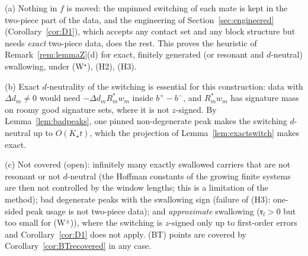 \begin{remark}\label{rem:S}
(a) Nothing in $f$ is moved: the unpinned switching of each mate is kept in
the two-piece part of the data, and the engineering of
Section~\ref{sec:engineered} (Corollary~\ref{cor:D1}), which accepts any
contact set and any block structure but needs \emph{exact} two-piece data,
does the rest.  This proves the heuristic of Remark~\ref{rem:lemmaZ}(d)
for exact, finitely generated (or resonant and $d$-neutral) swallowing,
under \textup{(W$^\star$)}, \textup{(H2)}, \textup{(H3)}.

(b) Exact $d$-neutrality of the switching is essential for this
construction: data with $\Delta d_m\neq0$ would need $-\Delta d_mR_m^*w_m$
inside $b^+-b^-$, and $R_m^*w_m$ has signature mass on roomy good signature
sets, where it is not $z$-signed.  By Lemma~\ref{lem:badpeaks}, one pinned
non-degenerate peak makes the switching $d$-neutral up to $O(K_\star t)$,
which the projection of Lemma~\ref{lem:exactswitch} makes exact.

(c) Not covered (open): infinitely many exactly swallowed carriers that are
not resonant or not $d$-neutral (the Hoffman constants of the growing
finite systems are then not controlled by the window lengths; this is a
limitation of the method); bad degenerate peaks with the swallowing sign
(failure of (H3): one-sided peak usage is not two-piece data); and
\emph{approximate} swallowing ($\mathfrak r_l>0$ but too small for
(W$^\pm$)), where the switching is $z$-signed only up to first-order errors
and Corollary~\ref{cor:D1} does not apply.  \textup{(BT)} points are
covered by Corollary~\ref{cor:BTrecovered} in any case.
\end{remark}
